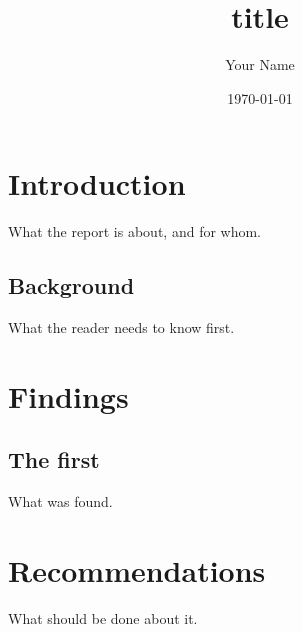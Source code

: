 \documentclass[11pt]{report}
\title{{{title}}}
\author{Your Name}
\date{\today}
\begin{document}
\maketitle
\tableofcontents

\chapter{Introduction}
\label{ch:introduction}

What the report is about, and for whom.

\section{Background}
\label{sec:background}

What the reader needs to know first.

\chapter{Findings}
\label{ch:findings}

\section{The first}
What was found.

\chapter{Recommendations}
\label{ch:recommendations}

What should be done about it.
\end{document}
